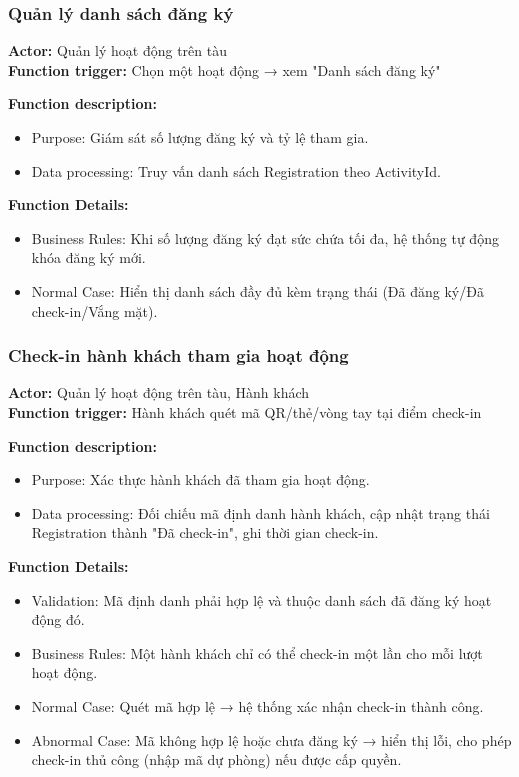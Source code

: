 \subsubsection{Quản lý danh sách đăng ký}
\textbf{Actor:} Quản lý hoạt động trên tàu \\
\textbf{Function trigger:} Chọn một hoạt động → xem "Danh sách đăng ký"

\textbf{Function description:}
\begin{itemize}
    \item Purpose: Giám sát số lượng đăng ký và tỷ lệ tham gia.
    \item Data processing: Truy vấn danh sách Registration theo
    ActivityId.
\end{itemize}

\textbf{Function Details:}
\begin{itemize}
    \item Business Rules: Khi số lượng đăng ký đạt sức chứa tối đa, hệ
    thống tự động khóa đăng ký mới.
    \item Normal Case: Hiển thị danh sách đầy đủ kèm trạng thái (Đã đăng
    ký/Đã check-in/Vắng mặt).
\end{itemize}


\subsubsection{Check-in hành khách tham gia hoạt động}
\textbf{Actor:} Quản lý hoạt động trên tàu, Hành khách \\
\textbf{Function trigger:} Hành khách quét mã QR/thẻ/vòng tay tại điểm
check-in

\textbf{Function description:}
\begin{itemize}
    \item Purpose: Xác thực hành khách đã tham gia hoạt động.
    \item Data processing: Đối chiếu mã định danh hành khách, cập nhật
    trạng thái Registration thành "Đã check-in", ghi thời gian check-in.
\end{itemize}

\textbf{Function Details:}
\begin{itemize}
    \item Validation: Mã định danh phải hợp lệ và thuộc danh sách đã đăng
    ký hoạt động đó.
    \item Business Rules: Một hành khách chỉ có thể check-in một lần cho
    mỗi lượt hoạt động.
    \item Normal Case: Quét mã hợp lệ → hệ thống xác nhận check-in thành
    công.
    \item Abnormal Case: Mã không hợp lệ hoặc chưa đăng ký → hiển thị
    lỗi, cho phép check-in thủ công (nhập mã dự phòng) nếu được cấp
    quyền.
\end{itemize}

